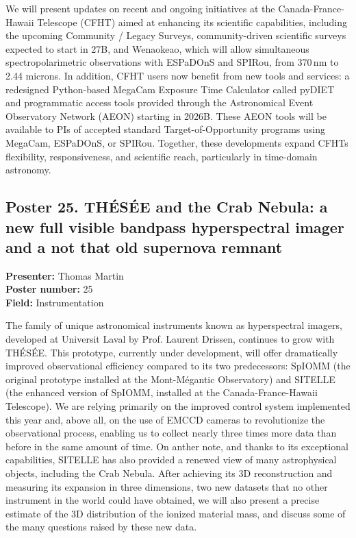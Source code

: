 We will present updates on recent and ongoing initiatives at the Canada-France-Hawaii Telescope (CFHT) aimed at enhancing its scientific capabilities, including the upcoming Community / Legacy Surveys, community-driven scientific surveys expected to start in 27B, and Wenaokeao, which will allow simultaneous spectropolarimetric observations with ESPaDOnS and SPIRou, from 370\,nm to 2.44 microns. In addition, CFHT users now benefit from new tools and services: a redesigned Python-based MegaCam Exposure Time Calculator called pyDIET and programmatic access tools provided through the Astronomical Event Observatory Network (AEON) starting in 2026B. These AEON tools will be available to PIs of accepted standard Target-of-Opportunity programs using MegaCam, ESPaDOnS, or SPIRou. Together, these developments expand CFHTs flexibility, responsiveness, and scientific reach, particularly in time-domain astronomy.

\hypertarget{poster-abstract-talk-195}{}\label{poster-abstract-page-talk-195}
\subsection*{Poster 25. TH\'ES\'EE and the Crab Nebula: a new full visible bandpass hyperspectral imager and a not that old supernova remnant}
\textbf{Presenter:} Thomas Martin\\
\textbf{Poster number:} 25\\
\textbf{Field:} Instrumentation

The family of unique astronomical instruments known as hyperspectral imagers, developed at Universit Laval by Prof. Laurent Drissen, continues to grow with TH\'ES\'EE. This prototype, currently under development, will offer dramatically improved observational efficiency compared to its two predecessors: SpIOMM (the original prototype installed at the Mont-Mégantic Observatory) and SITELLE (the enhanced version of SpIOMM, installed at the Canada-France-Hawaii Telescope). We are relying primarily on the improved control system implemented this year and, above all, on the use of EMCCD cameras to revolutionize the observational process, enabling us to collect nearly three times more data than before in the same amount of time. On anther note, and thanks to its exceptional capabilities, SITELLE has also provided a renewed view of many astrophysical objects, including the Crab Nebula. After achieving its 3D reconstruction and measuring its expansion in three dimensions, two new datasets that no other instrument in the world could have obtained, we will also present a precise estimate of the 3D distribution of the ionized material mass, and discuss some of the many questions raised by these new data.

